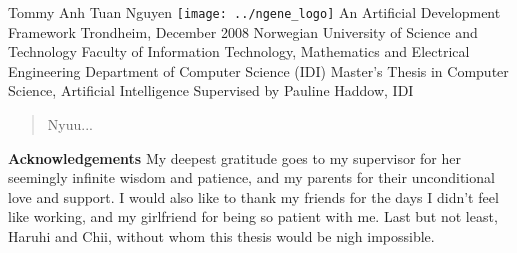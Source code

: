\documentclass[12pt,a4paper]{article}
\begin{document}
	\begin{titlepage}
		\changepage{}{}{2cm}{2cm}{}{3cm}{}{}{}
		\large\noindent
		Tommy Anh Tuan Nguyen\newline\newline\newline
		\texttt{[image: ../ngene\_logo]}\newline
		{\LARGE An Artificial Development Framework}\newline
		\newline
		\newline
		\newline
		\newline
		\newline
		\newline
		Trondheim, December 2008\newline
		\newline
		\newline
		{\Large Norwegian University of Science and Technology}\newline
		Faculty of Information Technology, Mathematics\newline
		and Electrical Engineering\newline
		Department of Computer Science (IDI)\newline
		\newline
		\newline
		Master's Thesis in Computer Science, Artificial Intelligence\newline
		\newline
		Supervised by Pauline Haddow, IDI
	\end{titlepage}
	\begin{abstract}
	Nyuu...
	\end{abstract}
	\newpage
	\noindent\textbf{\large Acknowledgements}\newline
	My deepest gratitude goes to my supervisor for her seemingly infinite wisdom and patience, and my parents for their unconditional love and support. I would also like to thank my friends for the days I didn't feel like working, and my girlfriend for being so patient with me.\newline
	\newline
	Last but not least, Haruhi and Chii, without whom this thesis would be nigh impossible.
	\newpage
	\pagestyle{headings}
	\tableofcontents
	\listoffigures
	\newpage
	
	
	
	
	
	
	
	
	
\end{document}
